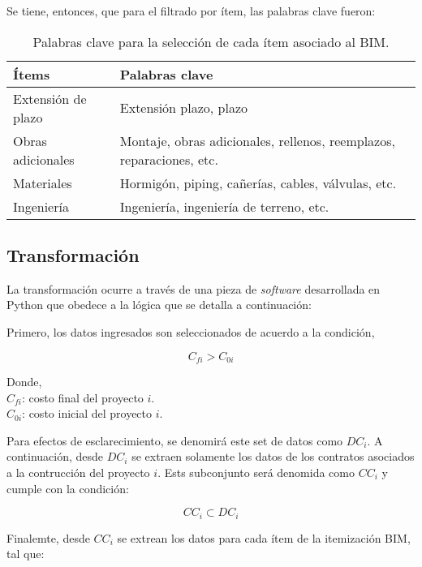Se tiene, entonces, que para el filtrado por ítem, las palabras clave fueron:

\begin{table}[H]
    \centering
    \caption{Palabras clave para la selección de cada ítem asociado al BIM.}
    \label{tab.keyw}
    \begin{tabular}{ll}
        \toprule
        \textbf{Ítems}      & \textbf{Palabras clave} \\
        \midrule
        Extensión de plazo  & Extensión plazo, plazo\\
        Obras adicionales   & Montaje, obras adicionales, rellenos, reemplazos, reparaciones, etc.\\
        Materiales          & Hormigón, piping, cañerías, cables, válvulas, etc. \\
        Ingeniería          & Ingeniería, ingeniería de terreno, etc. \\
        \bottomrule
    \end{tabular}
\end{table}

\subsection{Transformación}

La transformación ocurre a través de una pieza de \emph{software} desarrollada en Python que obedece a la lógica que se detalla a continuación:

Primero, los datos ingresados son seleccionados de acuerdo a la condición,

\begin{equation}
    C_{fi} > C_{0i}
\end{equation}

\noindent
Donde,\\
$C_{fi}$: costo final del proyecto $i$.\\
$C_{0i}$: costo inicial del proyecto $i$.

Para efectos de esclarecimiento, se denomirá este set de datos como $DC_i$. A continuación, desde $DC_i$ se extraen solamente los datos de los contratos asociados a la contrucción del proyecto $i$. Ests subconjunto será denomida como $CC_i$ y cumple con la condición:

\begin{equation}
    CC_i \subset DC_i
\end{equation}

Finalemte, desde $CC_i$ se extrean los datos para cada ítem de la itemización BIM, tal que:

